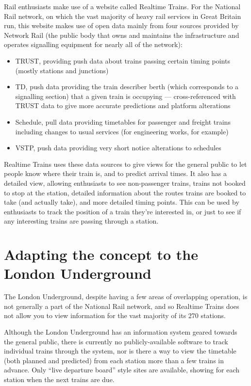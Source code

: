\documentclass[a4paper,12pt]{report}
\begin{document}
Rail enthusiasts make use of a website called Realtime Trains. For the National
Rail network, on which the vast majority of heavy rail services in Great
Britain run, this website makes use of open data mainly from four sources
provided by Network Rail (the public body that owns and maintains the
infrastructure and operates signalling equipment for nearly all of the
network)\cite{RTTData}:

\begin{itemize}
  \item TRUST, providing push data about trains passing certain timing points
    (mostly stations and junctions)
  \item TD, push data providing the train describer berth (which corresponds to
    a signalling section) that a given train is occupying --- cross-referenced
    with TRUST data to give more accurate predictions and platform alterations
  \item Schedule, pull data providing timetables for passenger and freight
    trains including changes to usual services (for engineering works, for
    example)
  \item VSTP, push data providing very short notice alterations to schedules
\end{itemize}

Realtime Trains uses these data sources to give views for the general public to
let people know where their train is, and to predict arrival times. It also has
a detailed view, allowing enthusiasts to see non-passenger trains, trains not
booked to stop at the station, detailed information about the routes trains are
booked to take (and actually take), and more detailed timing points. This can
be used by enthusiasts to track the position of a train they're interested in,
or just to see if any interesting trains are passing through a station.

\section{Adapting the concept to the London Underground}

The London Underground, despite having a few areas of overlapping operation, is
not generally a part of the National Rail network, and so Realtime Trains does
not allow you to view information for the vast majority of its 270 stations.

Although the London Underground has an information system geared towards the
general public, there is currently no publicly-available software to track
individual trains through the system, nor is there a way to view the timetable
(both planned and predicted) from each station more than a few trains in
advance. Only ``live departure board'' style sites are available, showing for
each station when the next trains are due.
\end{document}
